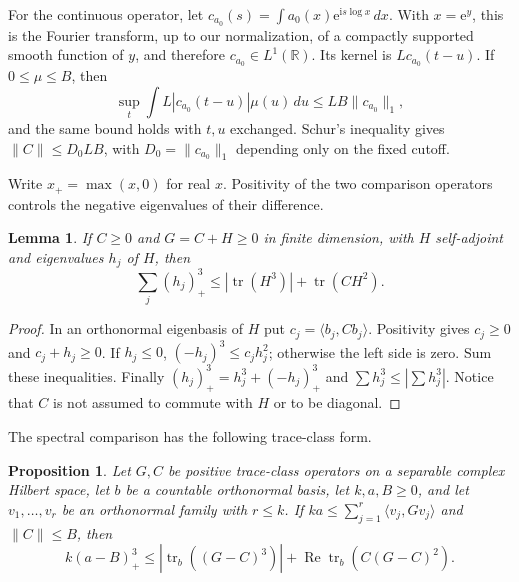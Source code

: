 \documentclass[11pt,a4paper,oneside]{article}
\newtheorem{lemma}[theorem]{Lemma}
\newtheorem{proposition}[theorem]{Proposition}
\theoremstyle{definition}
\newcommand{\R}{\mathbb R}
\newcommand{\ii}{\mathrm i}
\newcommand{\e}{\mathrm e}
\newcommand{\tr}{\operatorname{tr}}
\newcommand{\Rea}{\operatorname{Re}}
\numberwithin{equation}{section}
\begin{document}
For the continuous operator, let $c_{a_0}(s)=\int a_0(x)\e^{\ii s\log x}\,dx$. With $x=\e^y$, this is the Fourier transform, up to our normalization, of a compactly supported smooth function of $y$, and therefore $c_{a_0}\in L^1(\R)$. Its kernel is $Lc_{a_0}(t-u)$. If $0\le\mu\le B$, then
\[
 \sup_t\int L|c_{a_0}(t-u)|\mu(u)\,du\le LB\|c_{a_0}\|_1,
\]
and the same bound holds with $t,u$ exchanged. Schur's inequality gives $\|C\|\le D_0LB$, with $D_0=\|c_{a_0}\|_1$ depending only on the fixed cutoff.

Write $x_+=\max(x,0)$ for real $x$. Positivity of the two comparison operators controls the negative eigenvalues of their difference.
\begin{lemma}
If $C\ge0$ and $G=C+H\ge0$ in finite dimension, with $H$ self-adjoint and eigenvalues $h_j$
of $H$, then
\[
 \sum_j(h_j)_+^3\le|\tr(H^3)|+\tr(CH^2).
\]
\end{lemma}
\begin{proof}
In an orthonormal eigenbasis of $H$ put $c_j=\langle b_j,Cb_j\rangle$.
Positivity gives $c_j\ge0$ and $c_j+h_j\ge0$. If $h_j\le0$,
$(-h_j)^3\le c_jh_j^2$; otherwise the left side is zero. Sum these
inequalities. Finally $(h_j)_+^3=h_j^3+(-h_j)_+^3$ and
$\sum h_j^3\le|\sum h_j^3|$. Notice that $C$ is not assumed to commute
with $H$ or to be diagonal.
\end{proof}
The spectral comparison has the following trace-class form.
\begin{proposition}\label{input:spectral}
Let $G,C$ be positive trace-class operators on a separable complex Hilbert space, let $b$ be a countable orthonormal basis, let $k,a,B\ge0$, and let $v_1,\ldots,v_r$ be an orthonormal family with $r\le k$. If $ka\le\sum_{j=1}^r\langle v_j,Gv_j\rangle$ and $\|C\|\le B$, then
\[
 k(a-B)_+^3\le|\tr_b((G-C)^3)|+\Rea\tr_b(C(G-C)^2).
\]

\end{proposition}
\end{document}
